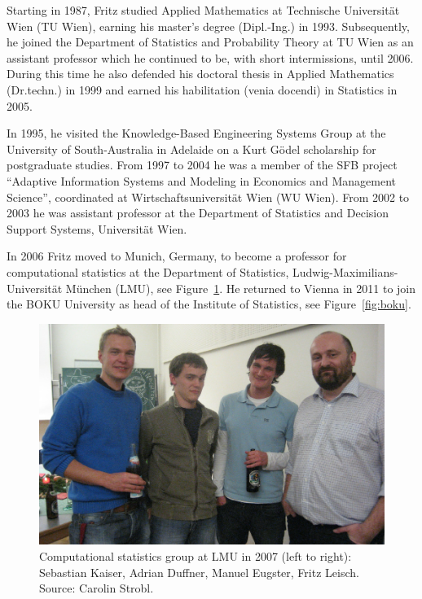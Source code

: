 Starting in 1987, Fritz studied Applied Mathematics at Technische Universität Wien (TU Wien),
earning his master's degree (Dipl.-Ing.) in 1993. Subsequently, he joined the
Department of Statistics and Probability Theory at TU Wien as an
assistant professor which he continued to be, with short intermissions, until 2006.
During this time he also defended his doctoral thesis in Applied Mathematics (Dr.techn.)
in 1999 and earned his habilitation (venia docendi) in Statistics in 2005.

In 1995, he visited the Knowledge-Based Engineering Systems Group at the University of
South-Australia in Adelaide on a Kurt Gödel scholarship for postgraduate
studies. From 1997 to 2004 he was a member of the SFB project
``Adaptive Information Systems and Modeling in Economics and Management Science'', coordinated
at Wirtschaftsuniversität Wien (WU Wien). From 2002 to 2003 he was assistant professor
at the Department of Statistics and Decision Support Systems, Universität Wien.

In 2006 Fritz moved to Munich, Germany, to become a professor for computational
statistics at the Department of Statistics, Ludwig-Maximilians-Universität München (LMU), see Figure~\ref{fig:lmu}.
He returned to Vienna in 2011 to join the BOKU University as head of the Institute of Statistics, see Figure~\ref{fig:boku}.

\begin{figure}[t!]

{\centering \includegraphics[width=0.83\linewidth]{fritz_files/figure-latex/lmu-1} 

}

\caption{Computational statistics group at LMU in 2007 (left to right): Sebastian Kaiser, Adrian Duffner, Manuel Eugster, Fritz Leisch. Source: Carolin Strobl.}\label{fig:lmu}
\end{figure}

